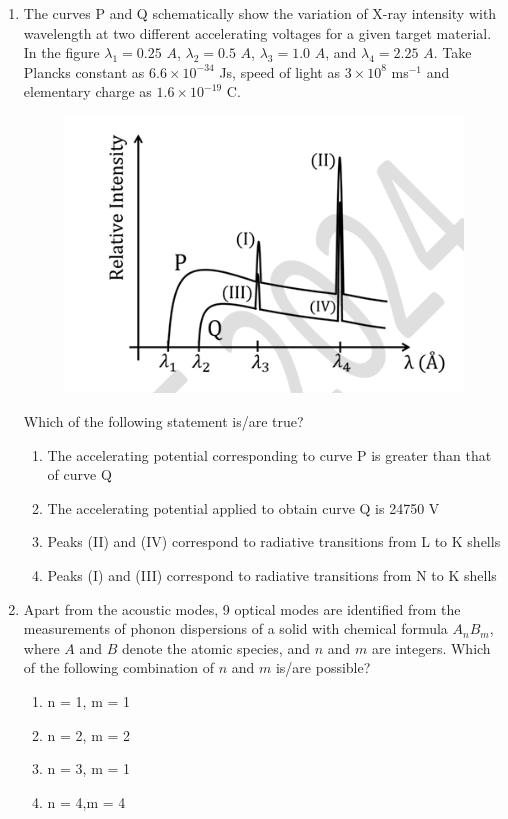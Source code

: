 \documentclass[journal,12pt,onecolumn]{IEEEtran}
\theoremstyle{remark}
\begin{document}
\begin{enumerate}
\item The curves P and Q schematically show the variation of X-ray intensity with wavelength at two different accelerating voltages for a given target material. In the figure $\lambda_1 = 0.25$ $A$, $\lambda_2 = 0.5$ $A$, $\lambda_3 = 1.0$ $A$, and $\lambda_4 = 2.25$ $A$. Take Plancks constant as $6.6 \times 10^{-34}$ Js, speed of light as $3 \times 10^{8}$ ms$^{-1}$ and elementary charge as $1.6 \times 10^{-19}$ C.
\begin{figure}[H]  
\centering  
\includegraphics[width = 0.3\columnwidth]{fig/Q53.png}     \caption*{}  
\label{fig: Q53} 
\end{figure} 
Which of the following statement is/are true?
\begin{enumerate}
    \item The accelerating potential corresponding to curve P is greater than that of curve Q
    \item The accelerating potential applied to obtain curve Q is 24750 V
    \item Peaks (II) and (IV) correspond to radiative transitions from L to K shells
    \item Peaks (I) and (III) correspond to radiative transitions from N to K shells
\end{enumerate}

\item Apart from the acoustic modes, 9 optical modes are identified from the measurements of phonon dispersions of a solid with chemical formula $A_nB_m$, where $A$ and $B$ denote the atomic species, and $n$ and $m$ are integers. Which of the following combination of $n$ and $m$ is/are possible?
\begin{enumerate}
    \item n = 1, m = 1
    \item n = 2, m = 2
    \item n = 3, m = 1
    \item n = 4,m = 4
\end{enumerate}


\end{enumerate}
\end{document}
